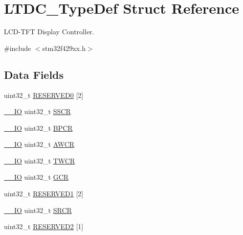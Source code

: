 \hypertarget{struct_l_t_d_c___type_def}{}\section{L\+T\+D\+C\+\_\+\+Type\+Def Struct Reference}
\label{struct_l_t_d_c___type_def}


L\+C\+D-\/\+T\+FT Display Controller.  




{\ttfamily \#include $<$stm32f429xx.\+h$>$}

\subsection*{Data Fields}
\begin{DoxyCompactItemize}
\item 
uint32\+\_\+t \hyperlink{struct_l_t_d_c___type_def_af2c92c7cb13569aaff6b4f5a25de5056}{R\+E\+S\+E\+R\+V\+E\+D0} \mbox{[}2\mbox{]}
\item 
\hyperlink{core__sc300_8h_aec43007d9998a0a0e01faede4133d6be}{\+\_\+\+\_\+\+IO} uint32\+\_\+t \hyperlink{struct_l_t_d_c___type_def_a3aa8cb3b286c630b9fa126616a1f6498}{S\+S\+CR}
\item 
\hyperlink{core__sc300_8h_aec43007d9998a0a0e01faede4133d6be}{\+\_\+\+\_\+\+IO} uint32\+\_\+t \hyperlink{struct_l_t_d_c___type_def_ab954c16d70935a24b62aad461a664878}{B\+P\+CR}
\item 
\hyperlink{core__sc300_8h_aec43007d9998a0a0e01faede4133d6be}{\+\_\+\+\_\+\+IO} uint32\+\_\+t \hyperlink{struct_l_t_d_c___type_def_a2277d6936f88a3bbb0b7fd1481b2c2c5}{A\+W\+CR}
\item 
\hyperlink{core__sc300_8h_aec43007d9998a0a0e01faede4133d6be}{\+\_\+\+\_\+\+IO} uint32\+\_\+t \hyperlink{struct_l_t_d_c___type_def_ace97ea64f6db802fc5488601bb8558ab}{T\+W\+CR}
\item 
\hyperlink{core__sc300_8h_aec43007d9998a0a0e01faede4133d6be}{\+\_\+\+\_\+\+IO} uint32\+\_\+t \hyperlink{struct_l_t_d_c___type_def_aae092d9d07574afe1fbc79c8bf7f7c19}{G\+CR}
\item 
uint32\+\_\+t \hyperlink{struct_l_t_d_c___type_def_a3c50f8698052818ea3024b4b52d65886}{R\+E\+S\+E\+R\+V\+E\+D1} \mbox{[}2\mbox{]}
\item 
\hyperlink{core__sc300_8h_aec43007d9998a0a0e01faede4133d6be}{\+\_\+\+\_\+\+IO} uint32\+\_\+t \hyperlink{struct_l_t_d_c___type_def_a92af0fef30467bfce8d1408f81cfda6d}{S\+R\+CR}
\item 
uint32\+\_\+t \hyperlink{struct_l_t_d_c___type_def_aa4de71b2a578cce3a67229dde3c6b52d}{R\+E\+S\+E\+R\+V\+E\+D2} \mbox{[}1\mbox{]}

\end{DoxyCompactItemize}
